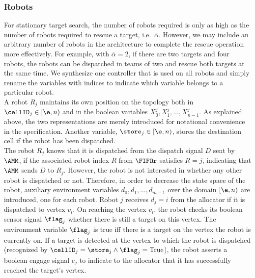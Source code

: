 \subsubsection{Robots}

For stationary target search, the number of robots required is only as high as the number of robots required to rescue a target, i.e.\ $\bar{\alpha}$. However, we may include an arbitrary number of robots in the architecture to complete the rescue operation more effectively. For example, with $\bar{\alpha} = 2$, if there are two targets and four robots, the robots can be dispatched in teams of two and rescue both targets at the same time. We synthesize one controller that is used on all robots and simply rename the variables with indices to indicate which variable belongs to a particular robot.\\

A robot $R_j$ maintains its own position on the topology both in $\cellID_j \in [\e, n)$ and in the boolean variables $X^j_0, X^j_1, \ldots, X^j_{n-1}$. As explained above, the two representations are merely introduced for notational convenience in the specification. Another variable, $\store_j \in [\e, n)$, stores the destination cell if the robot has been dispatched.\\

The robot $R_j$ knows that it is dispatched from the dispatch signal $D$ sent by $\AMM$, if the associated robot index $R$ from $\FIFOr$ satisfies $R = j$, indicating that $\AMM$ sends $D$ to $R_j$. However, the robot is not interested in whether any other robot is dispatched or not. Therefore, in order to decrease the state space of the robot, auxiliary environment variables $d_0, d_1, \ldots, d_{m-1}$ over the domain $[\e, n)$ are introduced, one for each robot. Robot $j$ receives $d_j = i$ from the allocator if it is dispatched to vertex $v_i$. On reaching the vertex $v_i$, the robot checks its boolean sensor signal $\flag_j$ whether there is still a target on this vertex. The environment variable $\flag_j$ is true iff there is a target on the vertex the robot is currently on. If a target is detected at the vertex to which the robot is dispatched (recognized by $\cellID_j = \store_j \wedge \flag_j = \mathrm{True}$), the robot asserts a boolean engage signal $e_j$ to indicate to the allocator that it has successfully reached the target's vertex.

\newcommand{\connE}[1]{\textstyle{E_{#1} = \sum_{j}(e_j \wedge X^j_{#1})}}
\newcommand{\connF}[1]{\textstyle{\flag_{#1} = \bigvee_{i} (X^{#1}_i \wedge f_i)}}\
\newcommand{\connD}[1]{\textstyle{d_{#1} = \begin{cases} D, &\text{if }R = {#1}\\ \e, &\text{otherwise}\end{cases}}}

